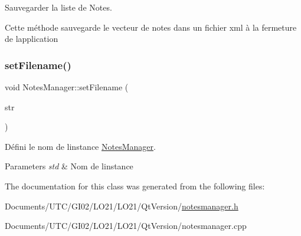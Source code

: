 Sauvegarder la liste de Notes. 

Cette méthode sauvegarde le vecteur de notes dans un fichier xml à la fermeture de l\textquotesingle{}application \mbox{\label{class_notes_manager_aaa57ac37417937f81173c0ad93298a2a}} 
\subsubsection{\texorpdfstring{set\+Filename()}{setFilename()}}
{\footnotesize\ttfamily void Notes\+Manager\+::set\+Filename (\begin{DoxyParamCaption}\item[{const Q\+String \&}]{str }\end{DoxyParamCaption})\hspace{0.3cm}{\ttfamily [inline]}}



Défini le nom de l\textquotesingle{}instance \hyperlink{class_notes_manager}{Notes\+Manager}. 


\begin{DoxyParams}{Parameters}
{\em std} & Nom de l\textquotesingle{}instance \\
\hline
\end{DoxyParams}


The documentation for this class was generated from the following files\+:\begin{DoxyCompactItemize}
\item 
Documents/\+U\+T\+C/\+G\+I02/\+L\+O21/\+L\+O21/\+Qt\+Version/\hyperlink{notesmanager_8h}{notesmanager.\+h}\item 
Documents/\+U\+T\+C/\+G\+I02/\+L\+O21/\+L\+O21/\+Qt\+Version/notesmanager.\+cpp\end{DoxyCompactItemize}
